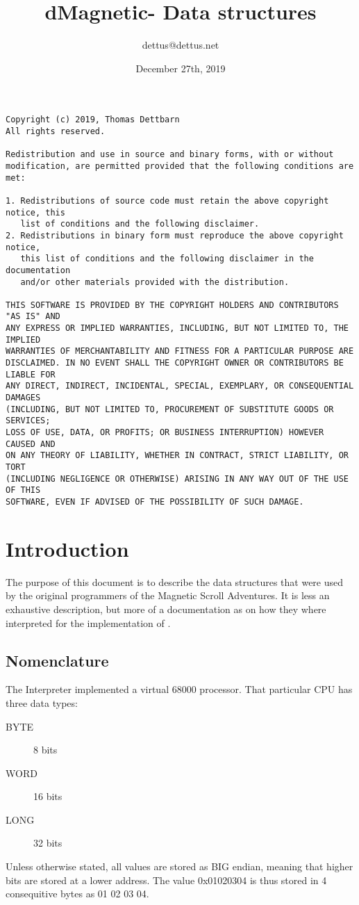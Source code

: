 \documentclass[11pt,twoside,openright]{report}
\begin{document}
\title{dMagnetic- Data structures}
\author{dettus@dettus.net}
\date{December 27th, 2019}
\maketitle
{\tiny
\begin{verbatim}
Copyright (c) 2019, Thomas Dettbarn
All rights reserved.

Redistribution and use in source and binary forms, with or without
modification, are permitted provided that the following conditions are met:

1. Redistributions of source code must retain the above copyright notice, this
   list of conditions and the following disclaimer.
2. Redistributions in binary form must reproduce the above copyright notice,
   this list of conditions and the following disclaimer in the documentation
   and/or other materials provided with the distribution.

THIS SOFTWARE IS PROVIDED BY THE COPYRIGHT HOLDERS AND CONTRIBUTORS "AS IS" AND
ANY EXPRESS OR IMPLIED WARRANTIES, INCLUDING, BUT NOT LIMITED TO, THE IMPLIED
WARRANTIES OF MERCHANTABILITY AND FITNESS FOR A PARTICULAR PURPOSE ARE
DISCLAIMED. IN NO EVENT SHALL THE COPYRIGHT OWNER OR CONTRIBUTORS BE LIABLE FOR
ANY DIRECT, INDIRECT, INCIDENTAL, SPECIAL, EXEMPLARY, OR CONSEQUENTIAL DAMAGES
(INCLUDING, BUT NOT LIMITED TO, PROCUREMENT OF SUBSTITUTE GOODS OR SERVICES;
LOSS OF USE, DATA, OR PROFITS; OR BUSINESS INTERRUPTION) HOWEVER CAUSED AND
ON ANY THEORY OF LIABILITY, WHETHER IN CONTRACT, STRICT LIABILITY, OR TORT
(INCLUDING NEGLIGENCE OR OTHERWISE) ARISING IN ANY WAY OUT OF THE USE OF THIS
SOFTWARE, EVEN IF ADVISED OF THE POSSIBILITY OF SUCH DAMAGE.
\end{verbatim}
}
\tableofcontents
\newpage
\chapter{Introduction}
The purpose of this document is to describe the data structures that were used by the original programmers of the Magnetic Scroll Adventures. It is less an exhaustive description, but more of a documentation as on how they where interpreted for the implementation of \dmagnetic.
\section{Nomenclature}
The Interpreter implemented a virtual 68000 processor. That particular CPU has three data types:
\begin{description}
\item[BYTE]{8 bits}
\item[WORD]{16 bits}
\item[LONG]{32 bits}
\end{description}
Unless otherwise stated, all values are stored as BIG endian, meaning that higher bits are stored at a lower address. The value 0x01020304 is thus stored in 4 consequitive bytes as 01 02 03 04.
\end{document}
